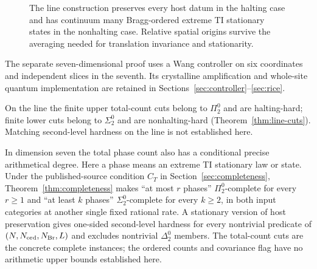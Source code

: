 \begin{figure}[ht]
\centering
{}
\caption{The line construction preserves every host datum in the halting
case and has continuum many Bragg-ordered extreme TI stationary states
in the nonhalting case. Relative spatial origins survive the averaging
needed for translation invariance and stationarity.}\label{fig:mechanism}
\end{figure}

The separate seven-dimensional proof uses a Wang controller on six
coordinates and independent slices in the seventh. Its crystalline
amplification and whole-site quantum implementation are retained in
Sections~\ref{sec:controller}--\ref{sec:rice}.

On the line the finite upper total-count cuts belong to $\Pi^0_2$ and are
halting-hard; finite lower cuts belong to $\Sigma^0_2$ and are
nonhalting-hard (Theorem~\ref{thm:line-cuts}). Matching second-level hardness
on the line is not established here.

In dimension seven the total phase count also has a conditional precise arithmetical degree. Here a phase means an extreme TI stationary law or state. Under the published-source condition $C_T$ in Section~\ref{sec:completeness}, Theorem~\ref{thm:completeness} makes ``at most $r$ phases'' $\Pi^0_2$-complete for every $r\ge1$ and ``at least $k$ phases'' $\Sigma^0_2$-complete for every $k\ge2$, in both input categories at another single fixed rational rate. A stationary version of host preservation gives one-sided second-level hardness for every nontrivial predicate of $(N,N_{\mathrm{ord}},N_{\mathrm{Br}},L)$ and excludes nontrivial $\Delta^0_2$ members. The total-count cuts are the concrete complete instances; the ordered counts and covariance flag have no arithmetic upper bounds established here.

